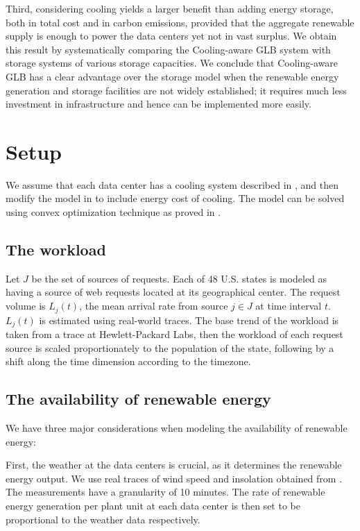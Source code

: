 \documentclass{acm_proc_article-sp}
\begin{document}
Third, considering cooling yields a larger benefit than adding energy storage, both in total cost and in carbon emissions, provided that the aggregate renewable supply is enough to power the data centers yet not in vast surplus. We obtain this result by systematically comparing the Cooling-aware GLB system with storage systems of various storage capacities. We conclude that Cooling-aware GLB has a clear advantage over the storage model when the renewable energy generation and storage facilities are not widely established; it requires much less investment in infrastructure and hence can be implemented more easily.

\section{Setup}
We assume that each data center has a cooling system described in \cite{adam:cooling}, and then modify the model in \cite{adam:GLB} to include energy cost of cooling. The model can be solved using convex optimization technique as proved in \cite{adam:GLBfull}.
\subsection{The workload}
Let $J$ be the set of sources of requests. Each of 48 U.S. states is modeled as having a source of web requests located at its geographical center. The request volume is $L_j(t)$, the mean arrival rate from source $j \in J$ at time interval $t$. $L_j(t)$ is estimated using real-world traces. The base trend of the workload is taken from a trace at Hewlett-Packard Labs, then the workload of each request source is scaled proportionately to the population of the state, following by a shift along the time dimension according to the timezone.

\subsection{The availability of renewable energy}
We have three major considerations when modeling the availability of renewable energy:

First, the weather at the data centers is crucial, as it determines the renewable energy output. We use real traces of wind speed and insolation obtained from \cite{renew1} \cite{renew2}.
The measurements have a granularity of 10 minutes. The rate of renewable energy generation per plant unit at each data center is then set to be proportional to the weather data respectively.
\end{document}
